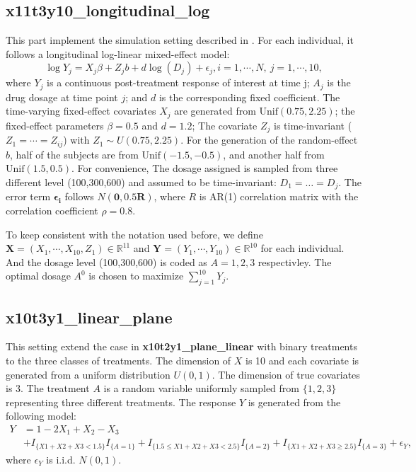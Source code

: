 \documentclass[12pt]{article}
\renewcommand{\vec}{\bm}
\begin{document}
\subsection*{x11t3y10\_longitudinal\_log}
This part implement the simulation setting described in \cite{zhu2016individualizing}. For each individual, it follows a longitudinal log-linear mixed-effect model:
\begin{equation}
\log Y_{j} = X_{j}\beta + Z_{j}b + d\log(D_j) +\epsilon_{j}, i=1,\cdots,N,~j=1,\cdots,10,
\end{equation}
where $Y_{j}$ is a continuous post-treatment response of interest at time j; $A_j$ is the drug dosage at time point $j$; and $d$ is the corresponding fixed coefficient. The time-varying fixed-effect covariates $X_{j}$ are generated from $\text{Unif}(0.75,2.25)$; the fixed-effect parameters  $\beta=0.5$ and $d=1.2$; The covariate $Z_{j}$ is time-invariant ($Z_{1}=\cdots=Z_{ij}$) with $Z_{1}\sim U(0.75,2.25)$. For the generation of the random-effect $b$, half of the subjects are from $\text{Unif}(-1.5,-0.5)$, and another half from $\text{Unif}(1.5,0.5)$. For convenience, The dosage assigned is sampled from three different level (100,300,600) and assumed to be time-invariant: $D_{1}=\dots=D_{j}$. The error term $\vec{\epsilon_i}$ follows $N(\vec{0}, 0.5\vec{R})$, where $R$ is AR(1) correlation matrix with the correlation coefficient $\rho=0.8$.

To keep consistent with the notation used before, we define $\vec{X}=(X_1,\cdots, X_{10},Z_1) \in \mathbb{R}^{11}$ and $\vec{Y}=(Y_1, \cdots,Y_10)\in \mathbb{R}^{10}$ for each individual. And the dosage level (100,300,600) is coded as $A=1,2,3$ respectivley. The optimal dosage  $A^0$ is chosen to maximize $\sum_{j=1}^{10} Y_j$.


\subsection*{x10t3y1\_linear\_plane}
This setting extend the case in \textbf{x10t2y1\_plane\_linear} with binary treatments to the three classes of treatments. The dimension of $X$ is 10 and each covariate is generated from a uniform distribution $U(0,1)$. The dimension of true covariates is 3. The treatment $A$ is a random variable uniformly sampled from $\{1,2,3\}$ representing three different treatments. The response $Y$ is generated from the following model: 
\begin{align*}
Y &= 1 -2X_1 + X_2 -X_3\\ &+ I_{\{X1+X2+X3<1.5\}}I_{\{A=1\}} + I_{\{1.5\leq X1+X2+X3<2.5\}}I_{\{A=2\}} + I_{\{X1+X2+X3\geq 2.5\}}I_{\{A=3\}}+ \epsilon_Y,
\end{align*}
where $\epsilon_Y$ is i.i.d. $N(0,1)$.
\end{document}
